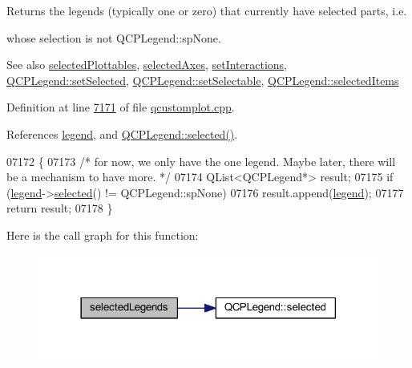 Returns the legends (typically one or zero) that currently have selected parts, i.\+e. 

whose selection is not Q\+C\+P\+Legend\+::sp\+None.

\begin{DoxySeeAlso}{See also}
\hyperlink{a00116_a6721b8c689bb7f2f400987e580508fe8}{selected\+Plottables}, \hyperlink{a00116_aa6baf867e8beb96ed5bd471f83ece903}{selected\+Axes}, \hyperlink{a00116_add9cc886ff5257f64fb4117cf6c135fe}{set\+Interactions}, \hyperlink{a00045_a752c48b30f8ba870b55e79659385f107}{Q\+C\+P\+Legend\+::set\+Selected}, \hyperlink{a00045_aae042f6211e39305d13f7b18c1c301d9}{Q\+C\+P\+Legend\+::set\+Selectable}, \hyperlink{a00045_ac93eaf236e911d67aa8b88942ef45c5e}{Q\+C\+P\+Legend\+::selected\+Items} 
\end{DoxySeeAlso}


Definition at line \hyperlink{a00115_source_l07171}{7171} of file \hyperlink{a00115_source}{qcustomplot.\+cpp}.



References \hyperlink{a00116_source_l02077}{legend}, and \hyperlink{a00116_source_l01476}{Q\+C\+P\+Legend\+::selected()}.


\begin{DoxyCode}
07172 \{
07173   \textcolor{comment}{/* for now, we only have the one legend. Maybe later, there will be a mechanism to have more. */}
07174   QList<QCPLegend*> result;
07175   \textcolor{keywordflow}{if} (\hyperlink{a00116_a75acd427ec48e9a9d2ae6a17817cc490}{legend}->\hyperlink{a00045_a10948e896935ad14f374e6f712afaae9}{selected}() != QCPLegend::spNone)
07176     result.append(\hyperlink{a00116_a75acd427ec48e9a9d2ae6a17817cc490}{legend});
07177   \textcolor{keywordflow}{return} result;
07178 \}
\end{DoxyCode}


Here is the call graph for this function\+:
\nopagebreak
\begin{figure}[H]
\begin{center}
\leavevmode
\includegraphics[width=318pt]{d4/d3e/a00116_a1ea6297300c3e2770e65f95836411755_cgraph}
\end{center}
\end{figure}


